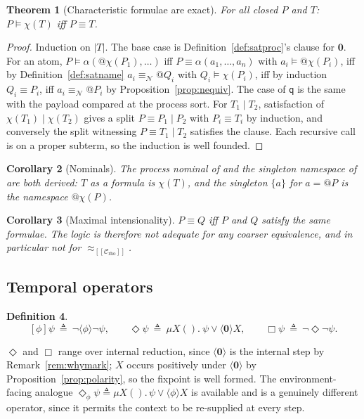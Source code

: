 \documentclass[11pt]{article}
\makeatletter
\theoremstyle{plain}
\newtheorem{theorem}{Theorem}[section]
\newtheorem{corollary}[theorem]{Corollary}
\theoremstyle{definition}
\newtheorem{definition}[theorem]{Definition}
\theoremstyle{remark}
\newcommand{\quo}[1]{@#1}
\newcommand{\nil}{\mathbf{0}}
\newcommand{\enc}[1]{[\![#1]\!]}
\newcommand{\nequiv}{\equiv_{\mathcal{N}}}
\newcommand{\Ctx}{\mathscr{C}}
\newcommand{\bisim}{\approx}
\newcommand{\qq}{\mathsf{q}}
\newcommand{\scong}{\equiv}
\newcommand{\may}[1]{\langle #1 \rangle}
\newcommand{\mst}[1]{[ #1 ]}
\newcommand{\sat}{\models}
\newcommand{\chf}[1]{\chi(#1)}
\newcommand{\fix}{\mu}
\makeatother
\begin{document}
\begin{theorem}[Characteristic formulae are exact]
\label{thm:char}
For all closed $P$ and $T$: $P \sat \chf{T}$ iff $P \scong T$.
\end{theorem}

\begin{proof}
Induction on $|T|$. The base case is Definition~\ref{def:satproc}'s clause for
$\nil$. For an atom, $P \sat \alpha(\quo{\chf{P_1}},\dots)$ iff
$P \scong \alpha(a_1,\dots,a_n)$ with $a_i \sat \quo{\chf{P_i}}$, iff by
Definition~\ref{def:satname} $a_i \nequiv \quo{Q_i}$ with $Q_i \sat \chf{P_i}$,
iff by induction $Q_i \scong P_i$, iff $a_i \nequiv \quo{P_i}$ by
Proposition~\ref{prop:nequiv}. The case of $\qq$ is the same with the payload
compared at the process sort. For $T_1 \mid T_2$, satisfaction of
$\chf{T_1} \mid \chf{T_2}$ gives a split $P \scong P_1 \mid P_2$ with
$P_i \scong T_i$ by induction, and conversely the split witnessing
$P \scong T_1 \mid T_2$ satisfies the clause. Each recursive call is on a proper
subterm, so the induction is well founded.
\end{proof}

\begin{corollary}[Nominals]
\label{cor:nominal}
The process nominal of \cite[\S6]{softwhere} and the singleton namespace of
\cite{f1r3space} are both derived: $T$ as a formula is $\chf{T}$, and the
singleton $\{a\}$ for $a = \quo{P}$ is the namespace $\quo{\chf{P}}$.
\end{corollary}

\begin{corollary}[Maximal intensionality]
\label{cor:intensional}
$P \scong Q$ iff $P$ and $Q$ satisfy the same formulae. The logic is therefore
not adequate for any coarser equivalence, and in particular not for
$\bisim_{\enc{\Ctx_{\mathrm{rho}}}}$.
\end{corollary}

\subsection{Temporal operators}

\begin{definition}
\label{def:temporal}
\[
  \mst{\phi}\psi \ \triangleq\ \neg\may{\phi}\neg\psi,
  \qquad
  \Diamond\psi \ \triangleq\ \fix X().\ \psi \vee \may{\nil}X,
  \qquad
  \Box\psi \ \triangleq\ \neg\Diamond\neg\psi .
\]
\end{definition}

$\Diamond$ and $\Box$ range over internal reduction, since $\may{\nil}$ is the
internal step by Remark~\ref{rem:whymark}; $X$ occurs positively under
$\may{\nil}$ by Proposition~\ref{prop:polarity}, so the fixpoint is well formed.
The environment-facing analogue $\Diamond_{\phi}\psi \triangleq \fix X().\,\psi
\vee \may{\phi}X$ is available and is a genuinely different operator, since it
permits the context to be re-supplied at every step.
\end{document}
